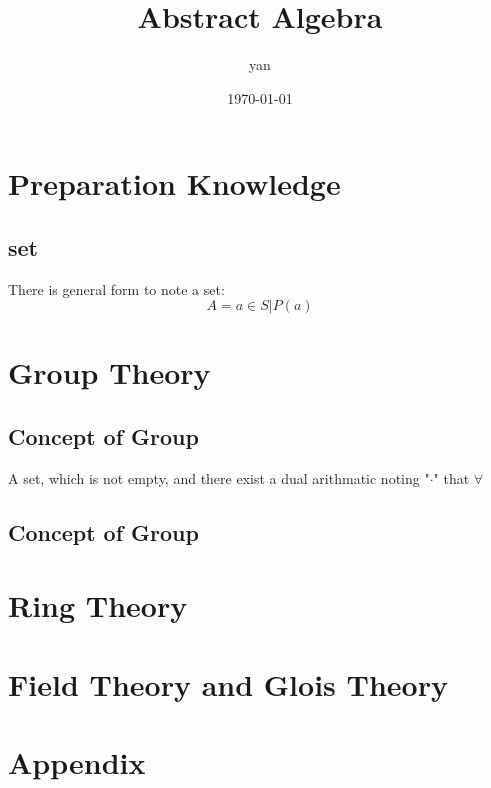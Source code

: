 \documentclass{book}
\title{Abstract Algebra}
\author{yan}
\date{\today}
\begin{document}
\frontmatter
\maketitle
\tableofcontents
\part{Preparation Knowledge}
\chapter{set}
There is  general form to note a set:
\begin{equation}
  A = { a \in S | P(a)}
\end{equation}

\mainmatter
\part{Group Theory}
\chapter{Concept of Group}
A set, which is not empty, and there exist a dual arithmatic noting "$\cdot$" that $\forall $ 

\chapter{Concept of Group}
\part{Ring Theory}
\part{Field Theory and Glois Theory}
\part{Appendix}
\end{document}
